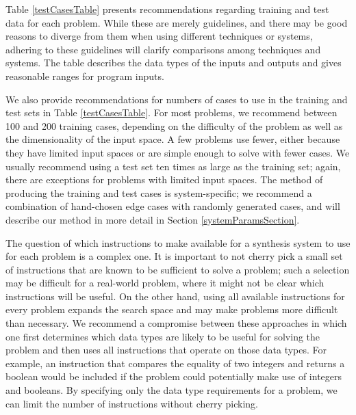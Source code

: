 \documentclass{sig-alternate}
\begin{document}
Table \ref{testCasesTable} presents recommendations regarding training and test data for each problem. While these are merely guidelines, and there may be good reasons to diverge from them when using different techniques or systems, adhering to these guidelines will clarify comparisons among techniques and systems. The table describes the data types of the inputs and outputs and gives reasonable ranges for program inputs. 

We also provide recommendations for numbers of cases to use in the training and test sets in Table \ref{testCasesTable}. For most problems, we recommend between 100 and 200 training cases, depending on the difficulty of the problem as well as the dimensionality of the input space. A few problems use fewer, either because they have limited input spaces or are simple enough to solve with fewer cases. We usually recommend using a test set ten times as large as the training set; again, there are exceptions for problems with limited input spaces. The method of producing the training and test cases is system-specific; we recommend a combination of hand-chosen edge cases with randomly generated cases, and will describe our method in more detail in Section \ref{systemParamsSection}.


The question of which instructions to make available for a synthesis system to use for each problem is a complex one. It is important to not cherry pick a small set of instructions that are known to be sufficient to solve a problem; such a selection may be difficult for a real-world problem, where it might not be clear which instructions will be useful. On the other hand, using all available instructions for every problem expands the search space and may make problems more difficult than necessary. We recommend a compromise between these approaches
in which one first determines which data types are likely to be useful for solving the problem and then uses all instructions that operate on those data types.
For example, an instruction that compares the equality of two integers and returns a boolean would be included if the problem could potentially make use of integers and booleans. 
By specifying only the data type requirements for a problem, we can limit the number of instructions without cherry picking. 
\end{document}
